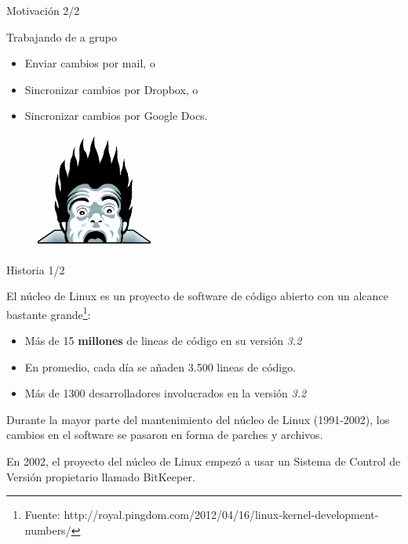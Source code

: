 \documentclass{beamer}
\begin{document}
\begin{frame}{Motivación 2/2}

    \begin{block}{Trabajando de a grupo}
        \begin{itemize}
            \item Enviar cambios por mail, o
            \pause
            \item Sincronizar cambios por Dropbox, o
            \pause
            \item Sincronizar cambios por Google Docs.
        \end{itemize}
    \end{block}

    \pause
    \begin{figure}[ht]
        \begin{center}
            \includegraphics[height=1.5in]{horror.png}
        \end{center}
    \end{figure}

\end{frame}

\begin{frame}{Historia 1/2}

    El núcleo de Linux es un proyecto de software de código abierto con un alcance bastante grande\footnote{Fuente: http://royal.pingdom.com/2012/04/16/linux-kernel-development-numbers/}:
    \begin{itemize}
        \item Más de 15 \textbf{millones} de lineas de código en su versión \textit{3.2}
        \item En promedio, cada día se añaden 3.500 lineas de código.
        \item Más de 1300 desarrolladores involucrados en la versión \textit{3.2}
    \end{itemize}

    \vspace{0.5em}

    Durante la mayor parte del mantenimiento del núcleo de Linux (1991-2002), los cambios en el software se pasaron en forma de parches y archivos.

    \vspace{0.5em}

    En 2002, el proyecto del núcleo de Linux empezó a usar un Sistema de Control de Versión propietario llamado BitKeeper.

\end{frame}
\end{document}
